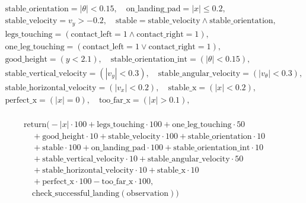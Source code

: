 \documentclass[a4paper, 12pt, fleqn]{report}
\begin{document}
{\scriptsize
\begin{center}
\begin{gather}
    \begin{aligned}
    & \text{stable\_orientation} = |\theta| < 0.15, \quad
      \text{on\_landing\_pad} = |x| \leq 0.2, \\
    & \text{stable\_velocity} = v_y > -0.2, \quad
     \text{stable} = \text{stable\_velocity} \land \text{stable\_orientation}, \\
    & \text{legs\_touching} = (\text{contact\_left} = 1 \land \text{contact\_right} = 1), \\
    & \text{one\_leg\_touching} = (\text{contact\_left} = 1 \lor \text{contact\_right} = 1), \\
    & \text{good\_height} = (y < 2.1), \quad
        \text{stable\_orientation\_int} =(|\theta| < 0.15), \\
    & \text{stable\_vertical\_velocity} = (|v_y| < 0.3), \quad
        \text{stable\_angular\_velocity} = (|v_\theta| < 0.3), \\
    & \text{stable\_horizontal\_velocity} = (|v_x| < 0.2), \quad
        \text{stable\_x} =(|x| < 0.2), \\
    & \text{perfect\_x} = (|x| = 0), \quad
        \text{too\_far\_x} = (|x| > 0.1), 
    \end{aligned}
\end{gather}



\begin{gather}
    \begin{aligned}
    & \text{return} \Big( 
        -|x| \cdot 100 + \text{legs\_touching} \cdot 100 + \text{one\_leg\_touching} \cdot 50 \\
    & \quad + \text{good\_height} \cdot 10 + \text{stable\_velocity} \cdot 100 + \text{stable\_orientation} \cdot 10 \\
    & \quad + \text{stable} \cdot 100 + \text{on\_landing\_pad} \cdot 100 + \text{stable\_orientation\_int} \cdot 10 \\
    & \quad + \text{stable\_vertical\_velocity} \cdot 10 + \text{stable\_angular\_velocity} \cdot 50 \\
    & \quad + \text{stable\_horizontal\_velocity} \cdot 10 + \text{stable\_x} \cdot 10 \\
    & \quad + \text{perfect\_x} \cdot 100 - \text{too\_far\_x} \cdot 100, \\
    & \quad \text{check\_successful\_landing}(\text{observation}) \Big)
    \end{aligned}
\end{gather}
\end{center}
}
\end{document}
